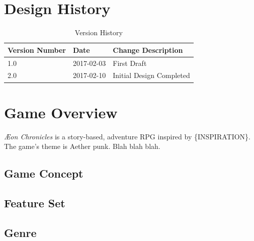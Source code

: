 \documentclass[12pt,titlepage]{article}
\title{\gametitle}
\subtitle{SUBTITLE?}
\author{Team Epsilon}
\date{\today}
\newcommand\gametitle{\textit{\AE on Chronicles}\xspace}
\begin{document}
\maketitle

\tableofcontents
\newpage
\listoffigures
\newpage
\listoftables


\newpage
\section{Design History}
\begin{table}[H]
    \caption{Version History}
    \label{tbl:version_history}
    \centering
    \begin{tabularx}{\linewidth}{| l | l || X |}
        \hline
        \textbf{Version Number} & \textbf{Date} & \textbf{Change Description} \\
        \hline\hline
        1.0 & 2017-02-03 & First Draft \\
        \hline
        2.0 & 2017-02-10 & Initial Design Completed \\
        \hline
    \end{tabularx}
\end{table}

\newpage
\section{Game Overview}
\gametitle is a story-based, adventure RPG inspired by \{INSPIRATION\}. The
game's theme is Aether punk. Blah blah blah.

\subsection{Game Concept}

\subsection{Feature Set}

\subsection{Genre}
\end{document}

